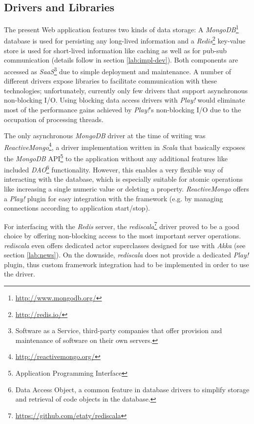 \subsection{Drivers and Libraries}
The present Web application features two kinds of data storage: A \textit{MongoDB}\footnote{\url{http://www.mongodb.org/}} database is used for persisting any long-lived information and a \textit{Redis}\footnote{\url{http://redis.io/}} key-value store is used for short-lived information like caching as well as for pub-sub communication (details follow in section \ref{lab:impl-dev}). Both components are accessed as \textit{SaaS}\footnote{Software as a Service, third-party companies that offer provision and maintenance of software on their own servers.} due to simple deployment and maintenance. A number of different drivers expose libraries to facilitate communication with these technologies; unfortunately, currently only few drivers that support asynchronous non-blocking I/O. Using blocking data access drivers with \textit{Play!} would eliminate most of the performance gains achieved by \textit{Play!}'s non-blocking I/O due to the occupation of processing threads. 

The only asynchronous \textit{MongoDB} driver at the time of writing was \textit{ReactiveMongo}\footnote{\url{http://reactivemongo.org/}}, a driver implementation written in \textit{Scala} that basically exposes the \textit{MongoDB} API\footnote{Application Programming Interface} to the application without any additional features like included \textit{DAO}\footnote{Data Access Object, a common feature in database drivers to simplify storage and retrieval of code objects in the database.} functionality. However, this enables a very flexible way of interacting with the database, which is especially suitable for atomic operations like increasing a single numeric value or deleting a property. \textit{ReactiveMongo} offers a \textit{Play!} plugin for easy integration with the framework (e.g. by managing connections according to application start/stop).

For interfacing with the \textit{Redis} server, the \textit{rediscala}\footnote{\url{https://github.com/etaty/rediscala}} driver proved to be a good choice by offering non-blocking access to the most important server operations. \textit{rediscala} even offers dedicated actor superclasses designed for use with \textit{Akka} (see section \ref{lab:news}). On the downside, \textit{rediscala} does not provide a dedicated \textit{Play!} plugin, thus custom framework integration had to be implemented in order to use the driver.

